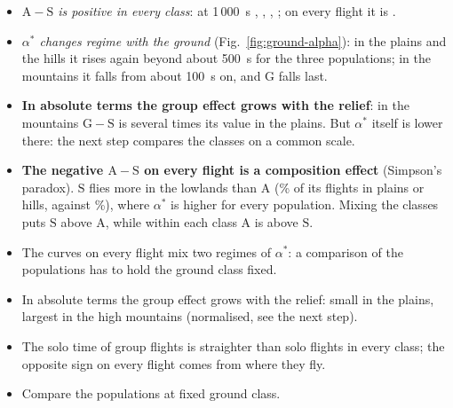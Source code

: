 \documentclass[10pt,a4paper]{article}
\newcommand{\G}{\mathrm{G}}
\newcommand{\A}{\mathrm{A}}
\newcommand{\Sl}{\mathrm{S}}
\newcommand{\Home}{\item[\textcolor{answer}{\textbf{Take home.}}]\color{black}}
\newcommand{\Ded}{\item[\textcolor{answer}{\textbf{Deduction.}}]\color{black}}
\newenvironment{step}{\begin{description}[leftmargin=0pt, itemsep=7pt, topsep=8pt]}{\end{description}}
\begin{document}
\begin{step}
\begin{itemize}
  \item \emph{$\A-\Sl$ is positive in every class}: at 1\,000~s \GroundPlainsASThousand, \GroundHillsASThousand,
    \GroundLowMtnASThousand, \GroundHighMtnASThousand; on every flight it is \ChainASThousand.
  \item \emph{$\alpha^*$ changes regime with the ground} (Fig.~\ref{fig:ground-alpha}): in the plains and the
    hills it rises again beyond about 500~s for the three populations; in the mountains it falls from about
    100~s on, and $\G$ falls last.
  \end{itemize}
\Ded\mbox{}
  \begin{itemize}
  \item \textbf{In absolute terms the group effect grows with the relief}: in the mountains $\G-\Sl$ is several
    times its value in the plains. But $\alpha^*$ itself is lower there: the next step compares the classes on
    a common scale.
  \item \textbf{The negative $\A-\Sl$ on every flight is a composition effect} (Simpson's paradox). $\Sl$ flies
    more in the lowlands than $\A$ (\GroundLowlandS\% of its flights in plains or hills, against
    \GroundLowlandA\%), where $\alpha^*$ is higher for every population. Mixing the classes puts $\Sl$ above
    $\A$, while within each class $\A$ is above $\Sl$.
  \item The curves on every flight mix two regimes of $\alpha^*$: a comparison of the populations has to hold
    the ground class fixed.
  \end{itemize}
\Home\mbox{}
  \begin{itemize}
  \item In absolute terms the group effect grows with the relief: small in the plains, largest in the high
    mountains (normalised, see the next step).
  \item The solo time of group flights is straighter than solo flights in every class; the opposite sign on
    every flight comes from where they fly.
  \item Compare the populations at fixed ground class.
  \end{itemize}
\end{step}
\end{document}
